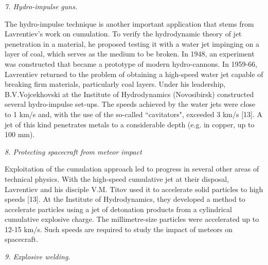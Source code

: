 \documentclass[%
 reprint,
onecolumn,
 amsmath,amssymb, aps,
]{revtex4-2}
\numberwithin{equation}{section}
\begin{document}
\textit{7. Hydro-impulse guns.}
\vspace{1mm}

The hydro-impulse technique is another important application that stems from Lavrentiev's work on cumulation.
To verify the hydrodynamic theory of jet penetration in a material, he proposed testing it with a water jet impinging on a layer of coal, which serves as the medium to be broken.
In 1948, an experiment was constructed that became a prototype of modern hydro-cannons.
In 1959-66, Lavrentiev returned to the problem of obtaining a high-speed water jet capable of breaking firm materials, particularly coal layers.
Under his leadership, B.V.Vojcekhovski at the Institute of Hydrodynamics (Novosibirsk) constructed several hydro-impulse set-ups.
The speeds achieved by the water jets were close to 1 km/s and, with the use of the so-called ``cavitators", exceeded 3 km/s [13].
A jet of this kind penetrates metals to a considerable depth (e.g. in copper, up to 100 mm).
\vspace{3mm}

\textit{8. Protecting spacecraft from meteor impact}
\vspace{1mm}

Exploitation of the cumulation approach led to progress in several other areas of technical physics.
With the high-speed cumulative jet  at their disposal, Lavrentiev and his disciple V.M. Titov used it to accelerate solid particles to high speeds [13].
At the Institute of Hydrodynamics, they developed a method to accelerate particles using a jet of detonation products from a cylindrical cumulative explosive charge.
The millimetre-size particles were accelerated up to 12-15 km/s.
Such speeds are required to study the impact of meteors on spacecraft.
\vspace{3mm}

\textit{9. Explosive welding.}
\vspace{1mm}
\end{document}
